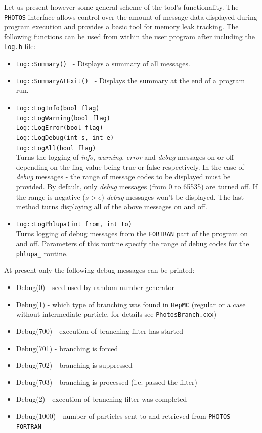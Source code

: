 \documentclass[]{Photos_interface_design}
\begin{document}
Let us present however some general scheme of the tool's
functionality.  The {\tt PHOTOS} interface allows control over the
amount of message data displayed during program execution and
provides a basic tool for memory leak tracking. The following
functions can be used from within the user program after including the
{\tt Log.h} file:
\begin{itemize}
  \item {\tt Log::Summary() } - Displays a summary of all messages.
  \item {\tt Log::SummaryAtExit() } - Displays the summary at the end of a program run.
  \item {\tt Log::LogInfo(bool flag) } \\
        {\tt Log::LogWarning(bool flag) } \\
        {\tt Log::LogError(bool flag) } \\
        {\tt Log::LogDebug(int s, int e) } \\
        {\tt Log::LogAll(bool flag)} \\
        Turns the logging of \textit{info}, \textit{warning}, \textit{error} and \textit{debug} messages on or off depending
        on the flag value being true or false respectively. In the case of \textit{debug} messages - the range of message codes
        to be displayed must be provided. By default, only \textit{debug} messages
        (from 0 to 65535) are turned off. If the range is negative ($s>e$) \textit{debug} messages
        won't be displayed. The last method turns displaying all of the above messages on and off.
  \item {\tt Log::LogPhlupa(int from, int to) } \\
        Turns logging of debug messages from the {\tt FORTRAN} part of the program on and off.
        Parameters of this routine specify the range of debug codes for the {\tt phlupa\_} routine.
\end{itemize}

At present only the following debug messages can be printed:
\begin{itemize}
  \item Debug(0)    - seed used by random number generator
  \item Debug(1)    - which type of branching was found in {\tt HepMC}
                     (regular or a case without intermediate particle, for details see {\tt PhotosBranch.cxx})
  \item Debug(700)  - execution of branching filter has started
  \item Debug(701)  - branching is forced
  \item Debug(702)  - branching is suppressed
  \item Debug(703)  - branching is processed (i.e. passed the filter)
  \item Debug(2)    - execution of branching filter was completed
  \item Debug(1000) - number of particles sent to and retrieved from {\tt PHOTOS FORTRAN}
\end{itemize}
 
\end{document}

